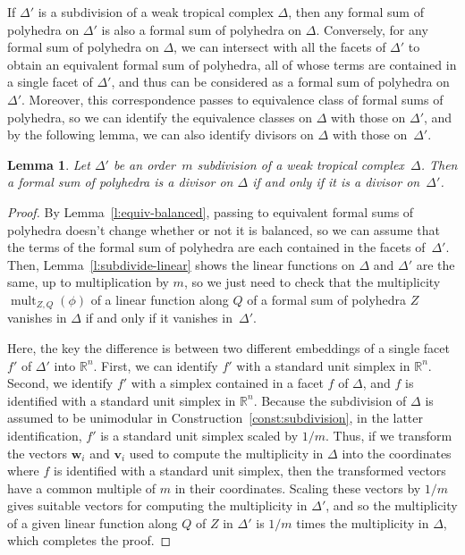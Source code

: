 \documentclass[11pt]{amsart}
\newtheorem{lem}[thm]{Lemma}
\theoremstyle{definition}
\newcommand{\mult}{\operatorname{mult}}
\newcommand{\RR}{\mathbb R}
\begin{document}
If $\Delta'$ is a subdivision of a weak tropical complex $\Delta$, then any
formal sum of polyhedra on $\Delta'$ is also a formal sum of polyhedra on
$\Delta$. Conversely, for any formal sum of polyhedra on $\Delta$, we can
intersect with all the facets of $\Delta'$ to obtain an equivalent formal sum
of polyhedra, all of whose terms are contained in a single facet of $\Delta'$,
and thus can be considered as a formal sum of polyhedra on $\Delta'$. Moreover,
this correspondence passes to equivalence class of formal sums of polyhedra,
so we can identify the equivalence classes on $\Delta$ with those on $\Delta'$,
and by the following lemma, we can also identify divisors on $\Delta$ with those
on~$\Delta'$.

\begin{lem}\label{l:subdivide-divisors}
Let $\Delta'$ be an order~$m$ subdivision of a weak tropical complex~$\Delta$.
Then a formal sum of polyhedra is a divisor on $\Delta$ if and only if it is a
divisor on~$\Delta'$.
\end{lem}

\begin{proof}
By Lemma~\ref{l:equiv-balanced}, passing to equivalent formal sums of polyhedra
doesn't change whether or not it is balanced, so we can assume that the terms of
the formal sum of polyhedra are each contained in the facets of~$\Delta'$. Then,
Lemma~\ref{l:subdivide-linear} shows the linear functions on $\Delta$ and
$\Delta'$ are the same, up to multiplication by $m$, so we just need to check
that the multiplicity $\mult_{Z,Q}(\phi)$ of a linear function along $Q$ of a
formal sum of polyhedra $Z$ vanishes in $\Delta$ if and only if it vanishes
in~$\Delta'$.

Here, the key the difference is between two different embeddings of a single
facet $f'$ of $\Delta'$ into $\RR^n$. First, we can identify $f'$ with a
standard unit simplex in $\RR^n$. Second, we identify $f'$ with a simplex
contained in a facet $f$ of $\Delta$, and $f$ is identified with a standard unit
simplex in $\RR^n$. Because the subdivision of $\Delta$ is assumed to be
unimodular in Construction~\ref{const:subdivision}, in the latter
identification, $f'$ is a standard unit simplex scaled by $1/m$. Thus, if we
transform the vectors $\mathbf w_i$ and $\mathbf v_i$ used to compute the
multiplicity in $\Delta$ into the coordinates where $f$ is identified with a
standard unit simplex, then the transformed vectors have a common multiple of
$m$ in their coordinates. Scaling these vectors by $1/m$ gives suitable vectors
for computing the multiplicity in $\Delta'$, and so the multiplicity of a given
linear function along $Q$ of $Z$ in $\Delta'$ is $1/m$ times the multiplicity in
$\Delta$, which completes the proof.
\end{proof}
\end{document}
